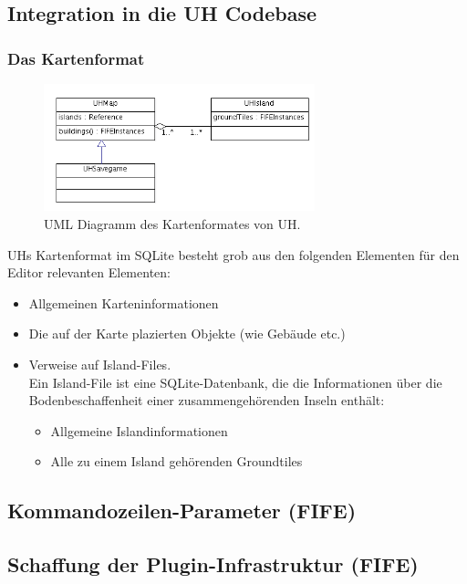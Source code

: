 \subsection{Integration in die UH Codebase}
\subsubsection{Das Kartenformat}
\label{kartenformat}

%
%
\begin{figure}[htbp]
  \centering
  
    \includegraphics[width=0.7\textwidth]{gfx/klassendiagramm-UHSaveGame.png}
  
  \caption{UML Diagramm des Kartenformates von UH.}
  \label{figure:automaton-intersection}
\end{figure}

UHs Kartenformat im SQLite besteht grob aus den folgenden Elementen für den
Editor relevanten Elementen:
\begin{itemize}
  \item Allgemeinen Karteninformationen
  \item Die auf der Karte plazierten Objekte (wie Gebäude etc.)
  \item Verweise auf Island-Files. \\ 
  Ein Island-File ist eine SQLite-Datenbank,
  die die Informationen über die Bodenbeschaffenheit einer zusammengehörenden
  Inseln enthält:
  \begin{itemize}
    \item Allgemeine Islandinformationen
    \item Alle zu einem Island gehörenden Groundtiles
  \end{itemize}
\end{itemize} 

\subsection{Kommandozeilen-Parameter (FIFE)}
\subsection{Schaffung der Plugin-Infrastruktur (FIFE)}

